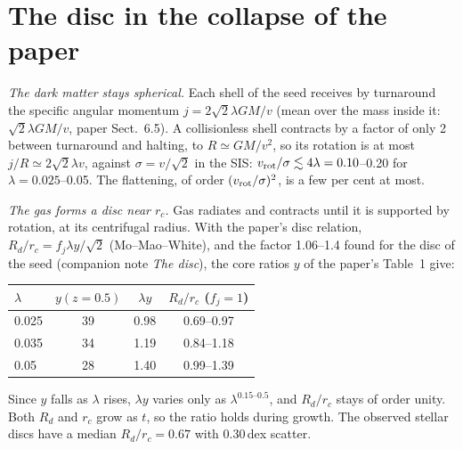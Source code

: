 \documentclass[11pt,a4paper]{article}
\theoremstyle{definition}
\theoremstyle{remark}
\newcommand{\rc}{r_c}
\newcommand{\Rd}{R_d}
\begin{document}
\section{The disc in the collapse of the paper}\label{sec:sth}

\emph{The dark matter stays spherical.} Each shell of the seed receives by turnaround the
specific angular momentum $j=2\sqrt2\lambda GM/v$ (mean over the mass inside it:
$\sqrt2\lambda GM/v$, paper Sect.~6.5). A collisionless shell contracts by a factor of only 2
between turnaround and halting, to $R\simeq GM/v^2$, so its rotation is at most
$j/R\simeq2\sqrt2\lambda v$, against $\sigma=v/\sqrt2$ in the SIS:
$v_{\rm rot}/\sigma\lesssim4\lambda=0.10$--0.20 for $\lambda=0.025$--0.05. The flattening,
of order $(v_{\rm rot}/\sigma)^2$, is a few per cent at most.

\emph{The gas forms a disc near $\rc$.} Gas radiates and contracts until it is supported by
rotation, at its centrifugal radius. With the paper's disc relation,
$\Rd/\rc=f_j\lambda y/\sqrt2$ (Mo--Mao--White), and the factor 1.06--1.4 found for the disc of
the seed (companion note \emph{The disc}), the core ratios $y$ of the paper's Table~1 give:
\begin{center}\small
\begin{tabular}{lccc}
\toprule
$\lambda$ & $y(z{=}0.5)$ & $\lambda y$ & $\Rd/\rc$ ($f_j=1$)\\
\midrule
0.025 & 39 & 0.98 & 0.69--0.97\\
0.035 & 34 & 1.19 & 0.84--1.18\\
0.05 & 28 & 1.40 & 0.99--1.39\\
\bottomrule
\end{tabular}
\end{center}
Since $y$ falls as $\lambda$ rises, $\lambda y$ varies only as $\lambda^{0.15\text{--}0.5}$, and
$\Rd/\rc$ stays of order unity. Both $\Rd$ and $\rc$ grow as $t$, so the ratio holds during
growth. The observed stellar discs have a median $\Rd/\rc=0.67$ with 0.30\,dex scatter.
\end{document}
